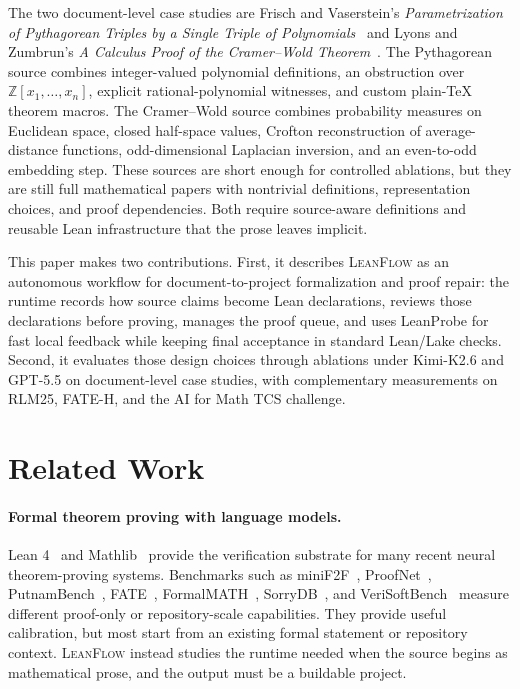 \documentclass{article}
\newcommand{\method}{\textsc{LeanFlow}\xspace}
\newcommand{\kimi}{Kimi-K2.6\xspace}
\newcommand{\gpt}{GPT-5.5\xspace}
\newcommand{\lean}{Lean\xspace}
\newcommand{\mathlib}{Mathlib\xspace}
\begin{document}
The two document-level case studies are Frisch and Vaserstein's \emph{Parametrization of Pythagorean Triples by a Single Triple of Polynomials}~\citep{frisch2007pythagorean} and Lyons and Zumbrun's \emph{A Calculus Proof of the Cramer--Wold Theorem}~\citep{lyons2017cramerwold}.
The Pythagorean source combines integer-valued polynomial definitions, an obstruction over $\mathbb{Z}[x_1,\ldots,x_n]$, explicit rational-polynomial witnesses, and custom plain-\TeX{} theorem macros.
The Cramer--Wold source combines probability measures on Euclidean space, closed half-space values, Crofton reconstruction of average-distance functions, odd-dimensional Laplacian inversion, and an even-to-odd embedding step.
These sources are short enough for controlled ablations, but they are still full mathematical papers with nontrivial definitions, representation choices, and proof dependencies.
Both require source-aware definitions and reusable \lean infrastructure that the prose leaves implicit.

This paper makes two contributions.
First, it describes \method as an autonomous workflow for document-to-project formalization and proof repair: the runtime records how source claims become \lean declarations, reviews those declarations before proving, manages the proof queue, and uses LeanProbe for fast local feedback while keeping final acceptance in standard \lean/Lake checks.
Second, it evaluates those design choices through ablations under \kimi and \gpt on document-level case studies, with complementary measurements on RLM25, FATE-H, and the AI for Math TCS challenge.

\section{Related Work}

\paragraph{Formal theorem proving with language models.}
Lean 4~\citep{demoura2021lean4} and \mathlib~\citep{mathlib2020} provide the verification substrate for many recent neural theorem-proving systems.
Benchmarks such as miniF2F~\citep{zheng2022minif2f}, ProofNet~\citep{azerbayev2023proofnet}, PutnamBench~\citep{tsoukalas2024putnambench}, FATE~\citep{jiang2025fate}, FormalMATH~\citep{yu2025formalmath}, SorryDB~\citep{letson2026sorrydb}, and VeriSoftBench~\citep{xin2026verisoftbench} measure different proof-only or repository-scale capabilities.
They provide useful calibration, but most start from an existing formal statement or repository context.
\method instead studies the runtime needed when the source begins as mathematical prose, and the output must be a buildable project.
\end{document}
